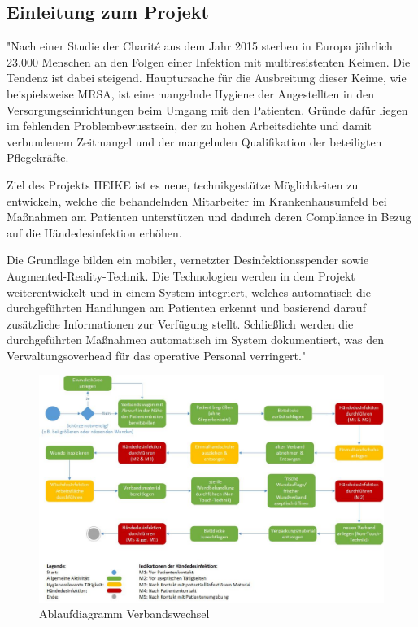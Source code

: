\newpage
\subsection{Einleitung zum Projekt}
\label{sec:Porjekt}

"Nach einer Studie der Charité aus dem Jahr 2015 sterben in Europa jährlich 23.000 Menschen an den Folgen einer Infektion mit multiresistenten Keimen. Die Tendenz ist dabei steigend. Hauptursache für die Ausbreitung dieser Keime, wie beispielsweise MRSA, ist eine mangelnde Hygiene der Angestellten in den Versorgungseinrichtungen beim Umgang mit den Patienten. Gründe dafür liegen im fehlenden Problembewusstsein, der zu hohen Arbeitsdichte und damit verbundenem Zeitmangel und der mangelnden Qualifikation der beteiligten Pflegekräfte.\par
Ziel des Projekts HEIKE ist es neue, technikgestütze Möglichkeiten zu entwickeln, welche die behandelnden Mitarbeiter im Krankenhausumfeld bei Maßnahmen am Patienten unterstützen und dadurch deren Compliance in Bezug auf die Händedesinfektion erhöhen. \par
Die Grundlage bilden ein mobiler, vernetzter Desinfektionsspender sowie Augmented-Reality-Technik. Die Technologien werden in dem Projekt weiterentwickelt und in einem System integriert, welches automatisch die durchgeführten Handlungen am Patienten erkennt und basierend darauf zusätzliche Informationen zur Verfügung stellt. Schließlich werden die durchgeführten Maßnahmen automatisch im System dokumentiert, was den Verwaltungsoverhead für das operative Personal verringert." \cite{FZI_Projekt}
\begin{figure}[htb]
  \centering  
  \includegraphics[scale=0.45]{img/Ablaufdiagramm_Verbandswechsel.jpg}
  \caption{Ablaufdiagramm Verbandswechsel \cite{AblauffdiagrammVerbandswechsel}}
  \label{fig:Ablaufdiagramm Verbandswechsel}
\end{figure}


